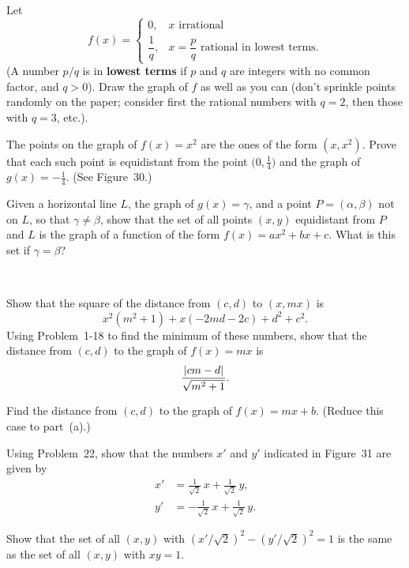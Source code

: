  Let
\[
f(x)=\begin{cases}
0, & x\text{ irrational}\\
\dfrac1q, & x=\dfrac pq\text{ rational in lowest terms.}
\end{cases}
\]
(A number $p/q$ is in \textbf{lowest terms} if $p$ and $q$ are integers with no
common factor, and $q>0$). Draw the graph of $f$ as well as you can (don't
sprinkle points randomly on the paper; consider first the rational numbers with
$q=2$, then those with $q=3$, etc.).

\begin{letters}
\item The points on the graph of $f(x)=x^2$ are the ones of the form
  $(x,x^2)$. Prove that each such point is equidistant from the point
  $\bigl(0,\frac14\bigr)$ and the graph of $g(x)=-\frac14$. (See Figure~30.)
\item Given a horizontal line $L$, the graph of $g(x)=\gamma$, and a point
  $P=(\alpha,\beta)$ not on $L$, so that $\gamma\neq\beta$, show that the set of
  all points $(x,y)$ equidistant from $P$ and $L$ is the graph of a function of
  the form $f(x)=ax^2+bx+c$. What is this set if $\gamma=\beta$?
\end{letters}

\begin{center}
\\[0.6em]
\end{center}

\begin{letters}
\item Show that the square of the distance from $(c,d)$ to $(x,mx)$ is
  \[
  x^2(m^2+1)+x(-2md-2c)+d^2+c^2.
  \]
  Using Problem~1-18 to find the minimum of these numbers, show that the
  distance from $(c,d)$ to the graph of $f(x)=mx$ is
  \[
  \frac{\lvert cm-d\rvert}{\sqrt{m^2+1}}.
  \]
\item Find the distance from $(c,d)$ to the graph of $f(x)=mx+b$. (Reduce this
  case to part~(a).)
\end{letters}

\begin{letters}
\item Using Problem~22, show that the numbers $x'$ and $y'$ indicated in
  Figure~31 are given by
  \begin{align*}
  x'&=\frac1{\sqrt2}\,x+\frac1{\sqrt2}\,y,\\
  y'&=-\frac1{\sqrt2}\,x+\frac1{\sqrt2}\,y.
  \end{align*}
\item Show that the set of all $(x,y)$ with $(x'/\sqrt2)^2-(y'/\sqrt2)^2=1$ is
  the same as the set of all $(x,y)$ with $xy=1$.
\end{letters}


